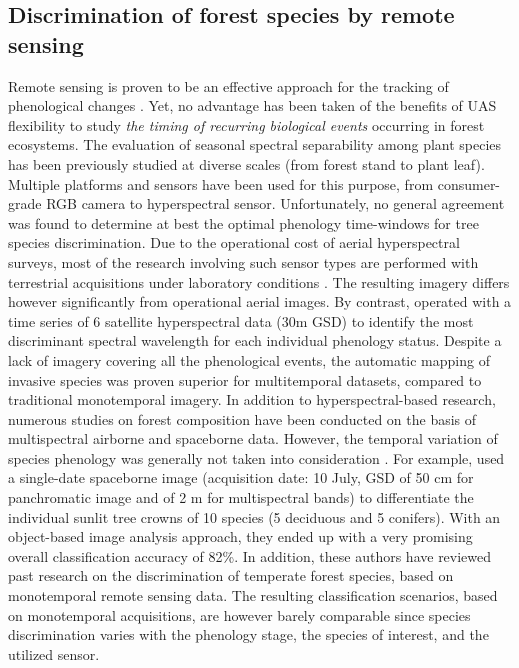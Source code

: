 \documentclass[remotesensing,article,submit,moreauthors,pdftex,12pt,a4paper]{mdpi} %
\begin{document}
\subsection{Discrimination of forest species by remote sensing}


Remote sensing is proven to be an effective approach for the tracking of phenological changes \cite{motohka_applicability_2010}. 
Yet, no advantage has been taken of the benefits of UAS flexibility to study \textit{the timing of recurring biological events} occurring in forest ecosystems. 
The evaluation of seasonal spectral separability among plant species has been previously studied at diverse scales (from forest stand to plant leaf). 
Multiple platforms and sensors have been used for this purpose, from consumer-grade RGB camera to hyperspectral sensor. 
Unfortunately, no general agreement was found to determine at best the optimal phenology time-windows for tree species discrimination. 
Due to the operational cost of aerial hyperspectral surveys, most of the research involving such sensor types are performed with terrestrial acquisitions under laboratory conditions \cite{burkholder_seasonal_2011, masaitis_influence_2013,cole_spectral_2014}. 
The resulting imagery differs however significantly from operational aerial images. 
By contrast, \citeauthor{somers_multitemporal_2013} \cite{somers_multitemporal_2013} operated with a time series of 6 satellite hyperspectral data (30m GSD) to identify the most discriminant spectral wavelength for each individual phenology status. 
Despite a lack of imagery covering all the phenological events, the automatic mapping of invasive species was proven superior for multitemporal datasets, compared to traditional monotemporal imagery.
In addition to hyperspectral-based research, numerous studies on forest composition have been conducted on the basis of multispectral airborne and spaceborne data. 
However, the temporal variation of species phenology was generally not taken into consideration \cite{heinzel_full_2008}. 
For example, \citeauthor{immitzer_tree_2012} \cite{immitzer_tree_2012} used a single-date spaceborne image (acquisition date: 10 July, GSD of 50 cm for panchromatic image and of 2 m for multispectral bands) to differentiate the individual sunlit tree crowns of 10 species (5 deciduous and 5 conifers). 
With an object-based image analysis approach, they ended up with a very promising overall classification accuracy of 82\%. 
In addition, these authors have reviewed past research on the discrimination of temperate forest species, based on monotemporal remote sensing data. 
The resulting classification scenarios, based on monotemporal acquisitions, are however barely comparable since species discrimination varies with the phenology stage, the species of interest, and the utilized sensor. 
\end{document}
